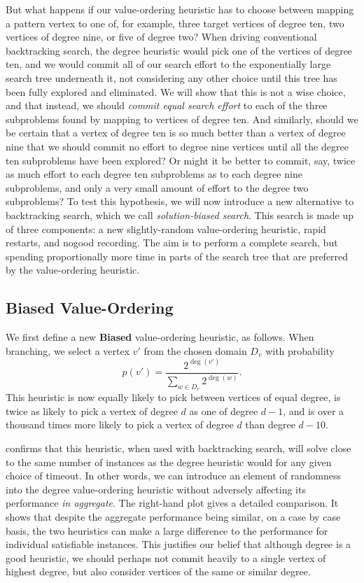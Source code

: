 \documentclass[runningheads]{llncs}
\begin{document}
But what happens if our value-ordering heuristic has to choose between mapping a pattern vertex to
one of, for example, three target vertices of degree ten, two vertices of degree nine, or five of
degree two? When driving conventional backtracking search, the degree heuristic would pick one of
the vertices of degree ten, and we would commit all of our search effort to the exponentially large
search tree underneath it, not considering any other choice until this tree has been fully explored
and eliminated.  We will show that this is not a wise choice, and that instead, we should
\emph{commit equal search effort} to each of the three subproblems found by mapping to vertices of
degree ten.  And similarly, should we be certain that a vertex of degree ten is so much better than a
vertex of degree nine that we should commit no effort to degree nine vertices until all the degree
ten subproblems have been explored? Or might it be better to commit, say, twice as much effort to
each degree ten subproblems as to each degree nine subproblems, and only a very small amount of
effort to the degree two subproblems?  To test this hypothesis, we will now introduce a new
alternative to backtracking search, which we call \emph{solution-biased search}.  This search is
made up of three components: a new slightly-random value-ordering heuristic, rapid restarts, and
nogood recording. The aim is to perform a complete search, but spending proportionally more time in
parts of the search tree that are preferred by the value-ordering heuristic.

\subsection{Biased Value-Ordering}

We first define a new \textbf{Biased} value-ordering heuristic, as follows. When branching, we
select a vertex $v'$ from the chosen domain $D_v$ with probability \[ p(v') =
\frac{2^{\deg(v')}}{\sum_{w \in D_v}{2^{\deg(w)}}} \text{.} \] This heuristic is now equally likely
to pick between vertices of equal degree, is twice as likely to pick a vertex of degree $d$ as one
of degree $d - 1$, and is over a thousand times more likely to pick a vertex of degree $d$ than
degree $d - 10$.

 confirms that this heuristic, when used with backtracking
search, will solve close to the same number of instances as the degree heuristic would for any given
choice of timeout. In other words, we can introduce an element of randomness into the degree
value-ordering heuristic without adversely affecting its performance \emph{in aggregate}.  The
right-hand plot gives a detailed comparison. It shows that despite the aggregate performance being
similar, on a case by case basis, the two heuristics can make a large difference to the performance
for individual satisfiable instances. This justifies our belief that although degree is a good
heuristic, we should perhaps not commit heavily to a single vertex of highest degree, but also consider
vertices of the same or similar degree.
\end{document}

